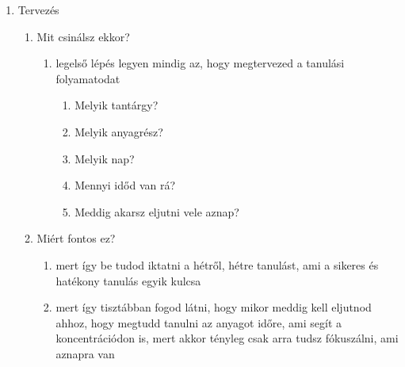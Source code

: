 \documentclass[../Main.tex]{subfiles}
\begin{document}
\begin{enumerate}
    \item {Tervezés}
    \begin{enumerate}
        \item {Mit csinálsz ekkor?}
        \begin{enumerate}
            \item legelső lépés legyen mindig az, hogy megtervezed a tanulási folyamatodat
            \begin{enumerate}
                \item Melyik tantárgy?
                \item Melyik anyagrész?
                \item Melyik nap?
				\item Mennyi időd van rá?
				\item Meddig akarsz eljutni vele aznap?
            \end{enumerate}
        \end{enumerate}
        \item Miért fontos ez?
        \begin{enumerate}
            \item mert így be tudod iktatni a hétről, hétre tanulást, ami a sikeres és hatékony tanulás egyik kulcsa
            \item mert így tisztábban fogod látni, hogy mikor meddig kell eljutnod ahhoz, hogy megtudd tanulni az anyagot
                 időre, ami segít a koncentrációdon is, mert akkor tényleg csak arra tudsz fókuszálni, ami aznapra van
        \end{enumerate}
    \end{enumerate}


\end{enumerate}
\end{document}
